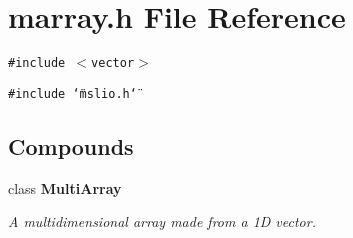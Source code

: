 \section{marray.h File Reference}
\label{marray_8h}
{\tt \#include $<$vector$>$}\par
{\tt \#include \char`\"{}mslio.h\char`\"{}}\par
\subsection*{Compounds}
\begin{CompactItemize}
\item 
class {\bf Multi\-Array}
\begin{CompactList}\small\item\em A multidimensional array made from a 1D vector.\item\end{CompactList}\end{CompactItemize}
